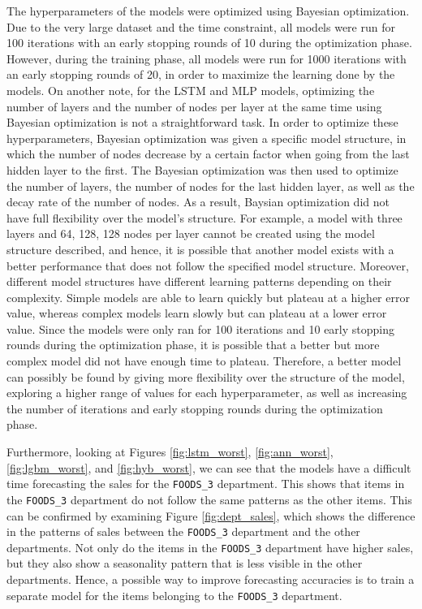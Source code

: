 The hyperparameters of the models were optimized using Bayesian optimization.
Due to the very large dataset and the time constraint, all models were run for 100 iterations with an early stopping rounds of 10 during the optimization phase. 
However, during the training phase, all models were run for 1000 iterations with an early stopping rounds of 20, in order to maximize the learning done by the models.
On another note, for the LSTM and MLP models, optimizing the number of layers and the number of nodes per layer at the same time using Bayesian optimization is not a straightforward task.
In order to optimize these hyperparameters, Bayesian optimization was given a specific model structure, in which the number of nodes decrease by a certain factor when going from the last hidden layer to the first.
The Bayesian optimization was then used to optimize the number of layers, the number of nodes for the last hidden layer, as well as the decay rate of the number of nodes.
As a result, Baysian optimization did not have full flexibility over the model's structure. 
For example, a model with three layers and 64, 128, 128 nodes per layer cannot be created using the model structure described, and hence, it is possible that another model exists with a better performance that does not follow the specified model structure.
Moreover, different model structures have different learning patterns depending on their complexity. 
Simple models are able to learn quickly but plateau at a higher error value, whereas complex models learn slowly but can plateau at a lower error value.
Since the models were only ran for 100 iterations and 10 early stopping rounds during the optimization phase, it is possible that a better but more complex model did not have enough time to plateau.
Therefore, a better model can possibly be found by giving more flexibility over the structure of the model, exploring a higher range of values for each hyperparameter, as well as increasing the number of iterations and early stopping rounds during the optimization phase.

Furthermore, looking at Figures \ref{fig:lstm_worst}, \ref{fig:ann_worst}, \ref{fig:lgbm_worst}, and \ref{fig:hyb_worst}, we can see that the models have a difficult time forecasting the sales for the \texttt{FOODS\_3} department.
This shows that items in the \texttt{FOODS\_3} department do not follow the same patterns as the other items.
This can be confirmed by examining Figure \ref{fig:dept_sales}, which shows the difference in the patterns of sales between the \texttt{FOODS\_3} department and the other departments.
Not only do the items in the \texttt{FOODS\_3} department have higher sales, but they also show a seasonality pattern that is less visible in the other departments.
Hence, a possible way to improve forecasting accuracies is to train a separate model for the items belonging to the \texttt{FOODS\_3} department.

